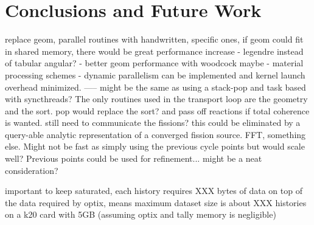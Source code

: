 \chapter{Conclusions and Future Work}
\label{chap:conclusions}

replace geom, parallel routines with handwritten, specific ones, if geom could fit in shared memory, there would be great performance increase
- legendre instead of tabular angular?
- better geom performance with woodcock maybe
- material processing schemes
- dynamic parallelism can be implemented and kernel launch overhead minimized.  
-----  might be the same as using a stack-pop and task based with syncthreads?  The only routines used in the transport loop are the geometry and the sort.   pop would replace the sort?  and pass off reactions if total coherence is wanted.  still need to communicate the fissions?  this could be eliminated by a query-able analytic representation of a converged fission source.  FFT, something else.  Might not be fast as simply using the previous cycle points but would scale well?  Previous points could be used for refinement...  might be a neat consideration?

important to keep saturated, each history requires XXX bytes of data on top of the data required by optix, means maximum dataset size is about XXX histories on a k20 card with 5GB (assuming optix and tally memory is negligible)